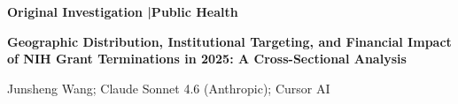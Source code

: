 \documentclass[10pt, letterpaper]{article}
\begin{document}
\thispagestyle{firstpage}
\sloppy

{\sffamily\bfseries\fontsize{9}{11}\selectfont
  \textcolor{jamacrimson}{Original Investigation}%
  \textcolor{jamadarkgray}{\enspace|\enspace Public Health}%
}

\vspace{8pt}

{\sffamily\bfseries\fontsize{18}{21}\selectfont\color{jamadarkgray}
Geographic Distribution, Institutional Targeting, and Financial Impact of NIH Grant Terminations in 2025: A Cross-Sectional Analysis\par}

\vspace{8pt}

{\fontsize{9.5}{11.5}\selectfont\color{jamadarkgray}
Junsheng Wang; Claude Sonnet 4.6 (Anthropic); Cursor AI\par}

\vspace{12pt}


\noindent{\color{jamalightgray}\rule{\textwidth}{0.5pt}}
\vspace{6pt}
\end{document}
